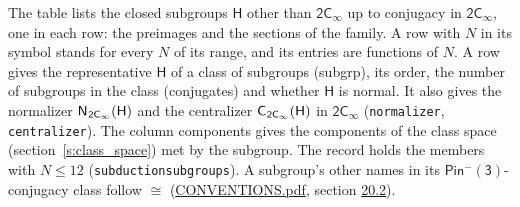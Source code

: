 \documentclass[10pt,a4paper]{article}
\numberwithin{equation}{section}
\newcommand{\grp}[1]{\mathsf{#1}}
\newcommand{\samecls}{\cong}
\newcommand{\hairsp}{\mkern1mu}
\begin{document}
\leavevmode\label{n:group.H}The table lists the closed subgroups $\grp{H}$ other than $\grp{2C_{\infty }}$ up to conjugacy in $\grp{2C_{\infty }}$, one in each row: the preimages and the sections of the family. \label{n:index.family.N}A row with $N$ in its symbol stands for every $N$ of its range, and its entries are functions of $N$. \label{n:head.subgroup}\label{n:head.order}\label{n:head.conjugates}\label{n:head.normal}A row gives the representative $\grp{H}$ of a class of subgroups (subgrp), its order, the number of subgroups in the class (conjugates) and whether $\grp{H}$ is normal. \label{n:group.normalizer}\label{n:group.centralizer}It also gives the normalizer $\grp{N}_{\hairsp \grp{2C_{\infty }}}(\grp{H})$ and the centralizer $\grp{C}_{\hairsp \grp{2C_{\infty }}}(\grp{H})$ in $\grp{2C_{\infty }}$ (\texttt{normalizer}, \texttt{centralizer}). \label{n:head.components}The column components gives the components of the class space (section~\ref{s:class_space}) met by the subgroup. The record holds the members with $N \le 12$ (\texttt{subductionsubgroups}). A subgroup's other names in its \href{Pinminus3.pdf}{$\grp{Pin^{-}(3)}$}-conjugacy class follow $\samecls$ (\href{../../CONVENTIONS.pdf}{CONVENTIONS.pdf}, section \href{../../CONVENTIONS.pdf\#conv.20.2}{20.2}).
\end{document}
